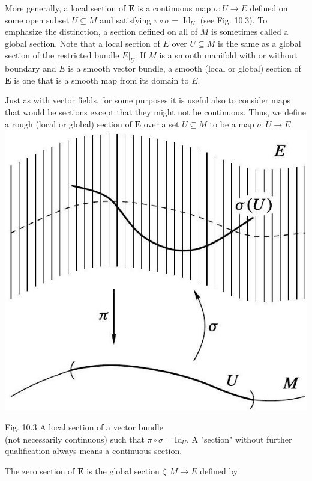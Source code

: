 \documentclass[10pt]{article}
\begin{document}
More generally, a local section of $\boldsymbol{E}$ is a continuous map $\sigma: U \rightarrow E$ defined on some open subset $U \subseteq M$ and satisfying $\pi \circ \sigma=\operatorname{Id}_{U}$ (see Fig. 10.3). To emphasize the distinction, a section defined on all of $M$ is sometimes called a global section. Note that a local section of $E$ over $U \subseteq M$ is the same as a global section of the restricted bundle $\left.E\right|_{U}$. If $M$ is a smooth manifold with or without boundary and $E$ is a smooth vector bundle, a smooth (local or global) section of $\boldsymbol{E}$ is one that is a smooth map from its domain to $E$.

Just as with vector fields, for some purposes it is useful also to consider maps that would be sections except that they might not be continuous. Thus, we define a rough (local or global) section of $\boldsymbol{E}$ over a set $U \subseteq M$ to be a map $\sigma: U \rightarrow E$\\
\includegraphics[max width=\textwidth, center]{2025_06_03_90f64b1a1e243cccc2e0g-274}

Fig. 10.3 A local section of a vector bundle\\
(not necessarily continuous) such that $\pi \circ \sigma=\mathrm{Id}_{U}$. A "section" without further qualification always means a continuous section.

The zero section of $\boldsymbol{E}$ is the global section $\zeta: M \rightarrow E$ defined by
\end{document}
